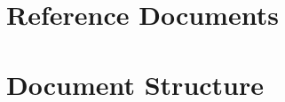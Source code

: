 \section{Reference Documents}
\label{sec:Reference Documents}%

\section{Document Structure}
\label{sec:Document Structure}%
